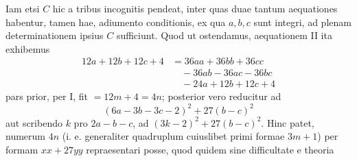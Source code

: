 Iam etsi \(C\) hic a tribus incognitis pendeat, inter quas duae tantum aequationes habentur, tamen hae, adiumento conditionis, ex qua \(a,\allowbreak b,\allowbreak c\) sunt integri, ad plenam determinationem ipsius \(C\) sufficiunt. Quod ut ostendamus, aequationem II ita exhibemus \[\begin{aligned}12a+12b+12c+4&=36aa+36bb+36cc\\&\quad-36ab-36ac-36bc\\&\quad-24a+12b+12c+4\end{aligned}\] pars prior, per I, fit \(=12m+4=4n\); posterior vero reducitur ad \[(6a-3b-3c-2)^2+27(b-c)^2\] aut scribendo \(k\) pro \(2a-b-c\), ad \((3k-2)^2+27(b-c)^2\). Hinc patet, numerum \(4n\) (i. e. generaliter quadruplum cuiuslibet primi formae \(3m+1\)) per formam \(xx+27yy\) repraesentari posse, quod quidem sine difficultate e theoria
